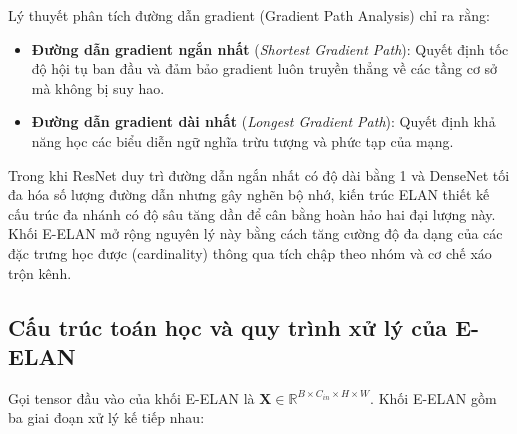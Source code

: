 \documentclass[fontsize=13pt,a4paper,oneside,DIV=calc,chapterprefix=true]{scrbook}
\begin{document}
Lý thuyết phân tích đường dẫn gradient (Gradient Path Analysis) chỉ ra rằng:
\begin{itemize}[leftmargin=1.2cm]
    \item \textbf{Đường dẫn gradient ngắn nhất} (\textit{Shortest Gradient Path}): Quyết định tốc độ hội tụ ban đầu và đảm bảo gradient luôn truyền thẳng về các tầng cơ sở mà không bị suy hao.
    \item \textbf{Đường dẫn gradient dài nhất} (\textit{Longest Gradient Path}): Quyết định khả năng học các biểu diễn ngữ nghĩa trừu tượng và phức tạp của mạng.
\end{itemize}
Trong khi ResNet duy trì đường dẫn ngắn nhất có độ dài bằng 1 và DenseNet tối đa hóa số lượng đường dẫn nhưng gây nghẽn bộ nhớ, kiến trúc ELAN thiết kế cấu trúc đa nhánh có độ sâu tăng dần để cân bằng hoàn hảo hai đại lượng này. Khối E-ELAN mở rộng nguyên lý này bằng cách tăng cường độ đa dạng của các đặc trưng học được (cardinality) thông qua tích chập theo nhóm và cơ chế xáo trộn kênh.

\subsection{Cấu trúc toán học và quy trình xử lý của E-ELAN}
Gọi tensor đầu vào của khối E-ELAN là $\mathbf{X} \in \mathbb{R}^{B \times C_{in} \times H \times W}$. Khối E-ELAN gồm ba giai đoạn xử lý kế tiếp nhau:
\end{document}
